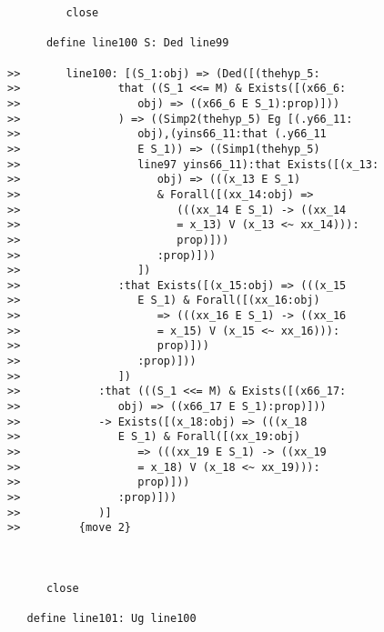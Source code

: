 \documentclass[12pt]{article}
\begin{document}
\begin{verbatim}
         close

      define line100 S: Ded line99

>>       line100: [(S_1:obj) => (Ded([(thehyp_5:
>>               that ((S_1 <<= M) & Exists([(x66_6:
>>                  obj) => ((x66_6 E S_1):prop)]))
>>               ) => ((Simp2(thehyp_5) Eg [(.y66_11:
>>                  obj),(yins66_11:that (.y66_11
>>                  E S_1)) => ((Simp1(thehyp_5)
>>                  line97 yins66_11):that Exists([(x_13:
>>                     obj) => (((x_13 E S_1)
>>                     & Forall([(xx_14:obj) =>
>>                        (((xx_14 E S_1) -> ((xx_14
>>                        = x_13) V (x_13 <~ xx_14))):
>>                        prop)]))
>>                     :prop)]))
>>                  ])
>>               :that Exists([(x_15:obj) => (((x_15
>>                  E S_1) & Forall([(xx_16:obj)
>>                     => (((xx_16 E S_1) -> ((xx_16
>>                     = x_15) V (x_15 <~ xx_16))):
>>                     prop)]))
>>                  :prop)]))
>>               ])
>>            :that (((S_1 <<= M) & Exists([(x66_17:
>>               obj) => ((x66_17 E S_1):prop)]))
>>            -> Exists([(x_18:obj) => (((x_18
>>               E S_1) & Forall([(xx_19:obj)
>>                  => (((xx_19 E S_1) -> ((xx_19
>>                  = x_18) V (x_18 <~ xx_19))):
>>                  prop)]))
>>               :prop)]))
>>            )]
>>         {move 2}



      close

   define line101: Ug line100


\end{verbatim}
\end{document}
